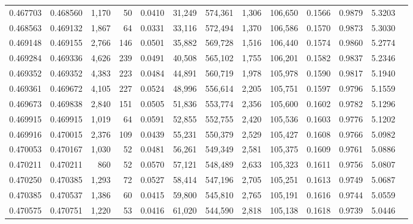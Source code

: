 \begin{tabular}{rrrrrrrrrrrrr}
0.467703 & 0.468560 & 1,170 &    50 &                                     0.0410 &  31,249 & 574,361 &   1,306 & 106,650 & 0.1566 & 0.9879 & 5.3203 \\
0.468563 & 0.469132 & 1,867 &    64 &                                     0.0331 &  33,116 & 572,494 &   1,370 & 106,586 & 0.1570 & 0.9873 & 5.3030 \\
0.469148 & 0.469155 & 2,766 &   146 &                                     0.0501 &  35,882 & 569,728 &   1,516 & 106,440 & 0.1574 & 0.9860 & 5.2774 \\
0.469284 & 0.469336 & 4,626 &   239 &                                     0.0491 &  40,508 & 565,102 &   1,755 & 106,201 & 0.1582 & 0.9837 & 5.2346 \\
0.469352 & 0.469352 & 4,383 &   223 &                                     0.0484 &  44,891 & 560,719 &   1,978 & 105,978 & 0.1590 & 0.9817 & 5.1940 \\
0.469361 & 0.469672 & 4,105 &   227 &                                     0.0524 &  48,996 & 556,614 &   2,205 & 105,751 & 0.1597 & 0.9796 & 5.1559 \\
0.469673 & 0.469838 & 2,840 &   151 &                                     0.0505 &  51,836 & 553,774 &   2,356 & 105,600 & 0.1602 & 0.9782 & 5.1296 \\
0.469915 & 0.469915 & 1,019 &    64 &                                     0.0591 &  52,855 & 552,755 &   2,420 & 105,536 & 0.1603 & 0.9776 & 5.1202 \\
0.469916 & 0.470015 & 2,376 &   109 &                                     0.0439 &  55,231 & 550,379 &   2,529 & 105,427 & 0.1608 & 0.9766 & 5.0982 \\
0.470053 & 0.470167 & 1,030 &    52 &                                     0.0481 &  56,261 & 549,349 &   2,581 & 105,375 & 0.1609 & 0.9761 & 5.0886 \\
0.470211 & 0.470211 &   860 &    52 &                                     0.0570 &  57,121 & 548,489 &   2,633 & 105,323 & 0.1611 & 0.9756 & 5.0807 \\
0.470250 & 0.470385 & 1,293 &    72 &                                     0.0527 &  58,414 & 547,196 &   2,705 & 105,251 & 0.1613 & 0.9749 & 5.0687 \\
0.470385 & 0.470537 & 1,386 &    60 &                                     0.0415 &  59,800 & 545,810 &   2,765 & 105,191 & 0.1616 & 0.9744 & 5.0559 \\
0.470575 & 0.470751 & 1,220 &    53 &                                     0.0416 &  61,020 & 544,590 &   2,818 & 105,138 & 0.1618 & 0.9739 & 5.0446 \\

\end{tabular}
